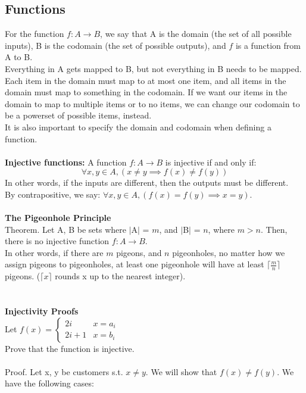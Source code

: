 \documentclass{article}
\begin{document}
\subsection{Functions}
For the function $f : A \rightarrow B$, we say that A is the domain (the set of all possible inputs), B is the codomain (the set of possible outputs), and $f$ is a function from A to B.\\
Everything in A gets mapped to B, but not everything in B needs to be mapped.\\
Each item in the domain must map to at most one item, and all items in the domain must map to something in the codomain. If we want our items in the domain to map to multiple items or to no items, we can change our codomain to be a powerset of possible items, instead.\\
It is also important to specify the domain and codomain when defining a function.
\\
\\
\textbf{Injective functions: }A function $f: A \rightarrow B$ is injective if and only if:
$$\forall x, y \in A, (x \neq y \implies f(x) \neq f(y))$$
In other words, if the inputs are different, then the outputs must be different.\\
By contrapositive, we say: $\forall x, y \in A, (f(x) = f(y) \implies x = y)$.\\
\\
\textbf{The Pigeonhole Principle}\\
Theorem. Let A, B be sets where $\mid$A$\mid$ = $m$, and $\mid$B$\mid$ = $n$, where $m > n$. Then, there is no injective function $f: A \rightarrow B$.\\
In other words, if there are $m$ pigeons, and $n$ pigeonholes, no matter how we assign pigeons to pigeonholes, at least one pigeonhole will have at least $\lceil \frac{m}{n} \rceil$ pigeons. ($\lceil x\rceil$ rounds x up to the nearest integer).\\
\\
\\
\textbf{Injectivity Proofs}\\
Let $f(x) = \begin{cases}
2i & x = a_i\\
2i + 1 & x = b_i
\end{cases}$\\
Prove that the function is injective.\\
\\
Proof. Let x, y be customers s.t. $x \neq y$. We will show that $f(x) \neq f(y)$. We have the following cases:
\end{document}
